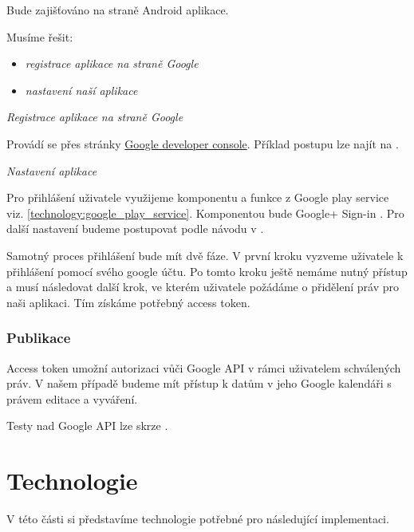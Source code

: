 \documentclass[thesis=B,czech]{FITthesis}[2012/06/26]
\begin{document}
Bude zajišťováno na straně Android aplikace.
\newline

Musíme řešit:
\begin{itemize}[nosep]
	\item \textit{registrace aplikace na straně Google}
	\item \textit{nastavení naší aplikace}
\end{itemize}

\vspace*{1\baselineskip}
\textit{Registrace aplikace na straně Google}

Provádí se přes stránky \href{''https://console.developers.google.com''}{Google developer console}\cite{design_google_console}. Příklad postupu lze najít na \cite{design_google_registration}. 
\newline

\textit{Nastavení aplikace}

Pro přihlášení uživatele využijeme komponentu a funkce z Google play service viz. \ref{technology:google_play_service}. Komponentou bude Google+ Sign-in \cite{design_google_signin_googleplus}. Pro další nastavení budeme postupovat podle návodu v \cite{design_facebook_android_login}.\newline

Samotný proces přihlášení bude mít dvě fáze. V první kroku vyzveme uživatele k přihlášení pomocí svého google účtu. Po tomto kroku ještě nemáme nutný přístup a musí následovat další krok, ve kterém uživatele požádáme o přidělení práv pro naši aplikaci. Tím získáme potřebný access token\cite{design_google_access_token}. 

\subsubsection{Publikace}

Access token umožní autorizaci vůči Google API v rámci uživatelem schválených práv. V našem případě budeme mít přístup k datům v jeho Google kalendáři s právem editace a vyváření.

Testy nad Google API lze skrze \cite{design_google_playground}.

 
\section{Technologie}

V této části si představíme technologie potřebné pro následující implementaci.
\end{document}
